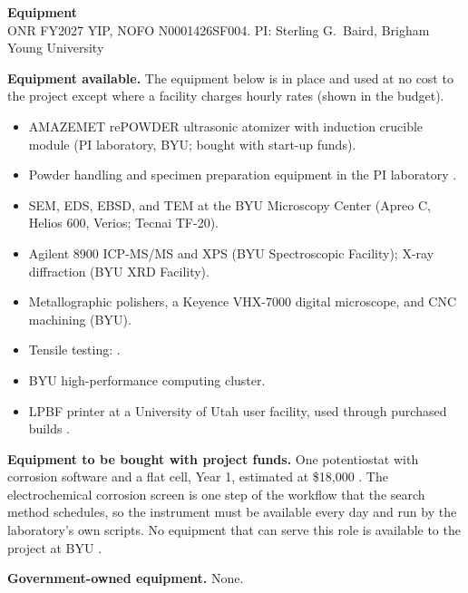 

\begin{center}\textbf{Equipment}\\
ONR FY2027 YIP, NOFO N0001426SF004. PI: Sterling G.\ Baird, Brigham Young University\end{center}

\textbf{Equipment available.} The equipment below is in place and used at no
cost to the project except where a facility charges hourly rates (shown in
the budget).
\begin{itemize}\setlength{\itemsep}{1pt}
\item AMAZEMET rePOWDER ultrasonic atomizer with induction crucible module
(PI laboratory, BYU; bought with start-up funds).
\item Powder handling and specimen preparation equipment in the PI
laboratory .
\item SEM, EDS, EBSD, and TEM at the BYU Microscopy Center (Apreo C,
Helios 600, Verios; Tecnai TF-20).
\item Agilent 8900 ICP-MS/MS and XPS (BYU Spectroscopic Facility); X-ray
diffraction (BYU XRD Facility).
\item Metallographic polishers, a Keyence VHX-7000 digital microscope, and
CNC machining (BYU).
\item Tensile testing: .
\item BYU high-performance computing cluster.
\item LPBF printer at a University of Utah user facility, used through
purchased builds .
\end{itemize}

\textbf{Equipment to be bought with project funds.} One potentiostat with
corrosion software and a flat cell, Year 1, estimated at \$18,000
. The electrochemical
corrosion screen is one step of the workflow that the search method
schedules, so the instrument must be available every day and run by the
laboratory's own scripts. No equipment that can serve this role is available
to the project at BYU .

\textbf{Government-owned equipment.} None.


